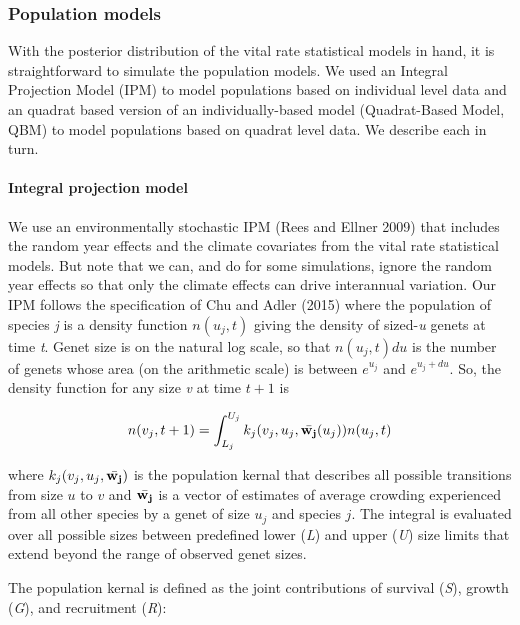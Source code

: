 \documentclass[12pt,]{article}
\begin{document}
\subsubsection{Population models}\label{population-models}

With the posterior distribution of the vital rate statistical models in
hand, it is straightforward to simulate the population models. We used
an Integral Projection Model (IPM) to model populations based on
individual level data and an quadrat based version of an
individually-based model (Quadrat-Based Model, QBM) to model populations
based on quadrat level data. We describe each in turn.

\paragraph{Integral projection model}\label{integral-projection-model}

We use an environmentally stochastic IPM (Rees and Ellner 2009) that
includes the random year effects and the climate covariates from the
vital rate statistical models. But note that we can, and do for some
simulations, ignore the random year effects so that only the climate
effects can drive interannual variation. Our IPM follows the
specification of Chu and Adler (2015) where the population of species
\emph{j} is a density function $n(u_{j},t)$ giving the density of
sized-\emph{u} genets at time \emph{t}. Genet size is on the natural log
scale, so that $n(u_{j},t)du$ is the number of genets whose area (on the
arithmetic scale) is between $e^{u_{j}}$ and $e^{u_{j}+du}$. So, the
density function for any size \emph{v} at time $t+1$ is

\begin{equation}
n(v_{j},t+1) = \int_{L_{j}}^{U_{j}} k_{j}(v_{j},u_{j},\bar{\bold{w_{j}}}(u_{j}))n(u_{j},t)
\end{equation}

where $k_{j}(v_{j},u_{j},\bar{\bold{w_{j}}})$ is the population kernal
that describes all possible transitions from size $u$ to $v$ and
$\bar{\bold{w_{j}}}$ is a vector of estimates of average crowding
experienced from all other species by a genet of size $u_j$ and species
$j$. The integral is evaluated over all possible sizes between
predefined lower (\emph{L}) and upper (\emph{U}) size limits that extend
beyond the range of observed genet sizes.

The population kernal is defined as the joint contributions of survival
(\emph{S}), growth (\emph{G}), and recruitment (\emph{R}):
\end{document}
